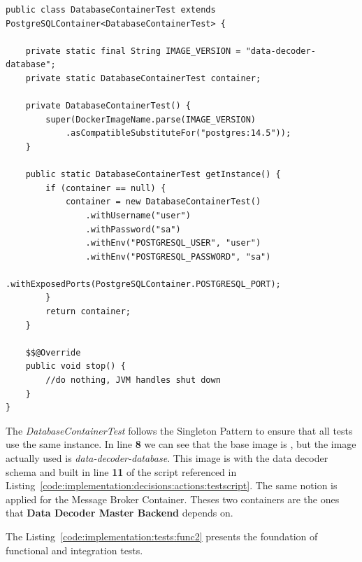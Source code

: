 \begin{lstlisting}[style=Java, caption=Functional Test - Message Broker - \textbf{Data Decoder Master Backend} Setup, label={code:implementation:tests:func1}]
public class DatabaseContainerTest extends PostgreSQLContainer<DatabaseContainerTest> {

    private static final String IMAGE_VERSION = "data-decoder-database";
    private static DatabaseContainerTest container;

    private DatabaseContainerTest() {
        super(DockerImageName.parse(IMAGE_VERSION)
            .asCompatibleSubstituteFor("postgres:14.5"));
    }

    public static DatabaseContainerTest getInstance() {
        if (container == null) {
            container = new DatabaseContainerTest()
                .withUsername("user")
                .withPassword("sa")
                .withEnv("POSTGRESQL_USER", "user")
                .withEnv("POSTGRESQL_PASSWORD", "sa")
                .withExposedPorts(PostgreSQLContainer.POSTGRESQL_PORT);
        }
        return container;
    }

    $$@Override
    public void stop() {
        //do nothing, JVM handles shut down
    }
}
\end{lstlisting}

The \textit{DatabaseContainerTest} follows the Singleton Pattern to ensure that all tests use the same instance. In line \textbf{8} we can see that the base image is , but the image actually used is \textit{data-decoder-database}. This image is  with the data decoder schema and built in line \textbf{11} of the script referenced in Listing~\ref{code:implementation:decisions:actions:testscript}. The same notion is applied for the Message Broker Container. Theses two containers are the ones that \textbf{Data Decoder Master Backend} depends on.

The Listing~\ref{code:implementation:tests:func2} presents the foundation of functional and integration tests.


